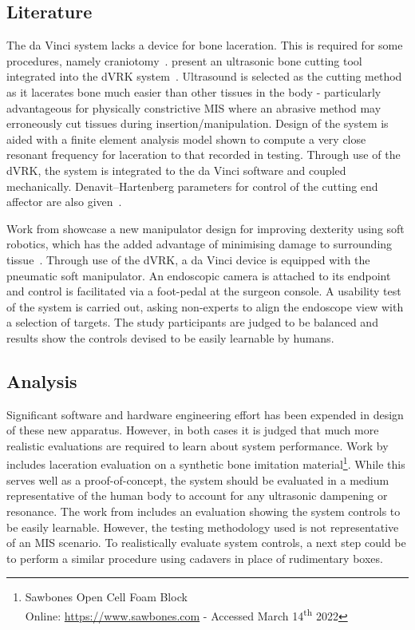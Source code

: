 \documentclass[english]{sobraep}
\begin{document}
\subsection{Literature}
\par{The da Vinci system lacks a device for bone laceration. This is required for some procedures, namely craniotomy~\cite{Fernandez-de_Thomas2022-ih}. \citeauthor{bone-cutter} present an ultrasonic bone cutting tool integrated into the dVRK system~\cite{bone-cutter}. Ultrasound is selected as the cutting method as it lacerates bone much easier than other tissues in the body - particularly advantageous for physically constrictive MIS where an abrasive method may erroneously cut tissues during insertion/manipulation. Design of the system is aided with a finite element analysis model shown to compute a very close resonant frequency for laceration to that recorded in testing. Through use of the dVRK, the system is integrated to the da Vinci software and coupled mechanically. Denavit–Hartenberg parameters for control of the cutting end affector are also given~\cite[Table 3]{bone-cutter}.}

\par{Work from  \citeauthor{soft-manip} showcase a new manipulator design for improving dexterity using soft robotics, which has the added advantage of minimising damage to surrounding tissue~\cite{soft-manip}. Through use of the dVRK, a da Vinci device is equipped with the pneumatic soft manipulator. An endoscopic camera is attached to its endpoint and control  is facilitated via a foot-pedal at the surgeon console. A usability test of the system is carried out, asking non-experts to align the endoscope view with a selection of targets. The study participants are judged to be balanced and results show the controls devised to be easily learnable by humans.}
\subsection{Analysis}
\par{Significant software and hardware engineering effort has been expended in design of these new apparatus.  However, in both cases it is judged that much more realistic evaluations are required to learn about system performance. Work by \citeauthor{bone-cutter} includes laceration evaluation on a synthetic bone imitation material\footnote{Sawbones\textregistered{}  Open Cell Foam Block\\ Online: \url{https://www.sawbones.com} - Accessed March 14\textsuperscript{th} 2022}. While this serves well as a proof-of-concept, the system should be evaluated in a medium representative of the human body to account for any ultrasonic dampening or resonance. The work from \citeauthor{soft-manip} includes an evaluation showing the system controls to be easily learnable. However, the testing methodology used is not representative of an MIS scenario. To realistically evaluate system controls, a next step could be to perform a similar procedure using cadavers in place of rudimentary boxes. }
\end{document}
